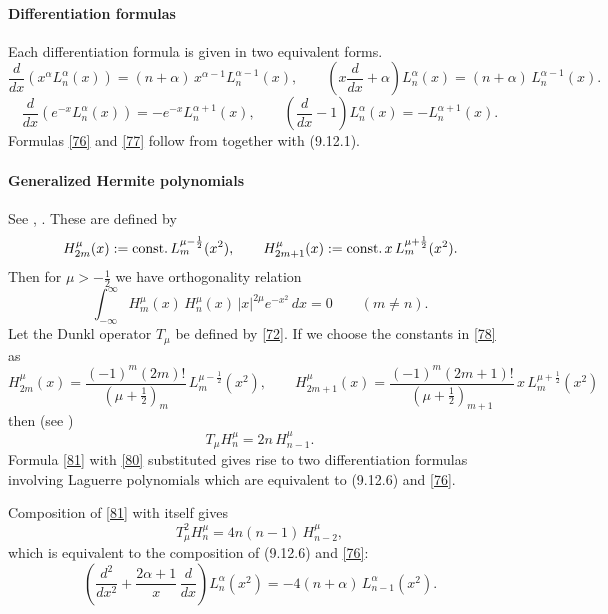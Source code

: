 \documentclass[envcountchap,graybox]{svmono}
\newcounter{rom}
\newcommand\al\alpha
\newcommand\half{\frac12}
\newcommand\thalf{\tfrac12}
\newcommand\iy\infty
\newcommand\const{{\rm const.}\,}
\begin{document}
\paragraph{Differentiation formulas}
Each differentiation formula is given in two equivalent forms.
\begin{equation}
\frac d{dx}\left(x^\al L_n^\al(x)\right)=
(n+\al)\,x^{\al-1} L_n^{\al-1}(x),\qquad
\left(x\frac d{dx}+\al\right)L_n^\al(x)=
(n+\al)\,L_n^{\al-1}(x).
\label{76}
\end{equation}
%
\begin{equation}
\frac d{dx}\left(e^{-x} L_n^\al(x)\right)=
-e^{-x} L_n^{\al+1}(x),\qquad
\left(\frac d{dx}-1\right)L_n^\al(x)=
-L_n^{\al+1}(x).
\label{77}
\end{equation}
%
Formulas \eqref{76} and \eqref{77} follow from
together with (9.12.1). 
%
\paragraph{Generalized Hermite polynomials}
See , \cite[Section 1.5.1]{K26}.
These are defined by
\begin{equation}
H_{2m}^\mu(x):=\const L_m^{\mu-\half}(x^2),\qquad
H_{2m+1}^\mu(x):=\const x\,L_m^{\mu+\half}(x^2).
\label{78}
\end{equation}
Then for $\mu>-\thalf$ we have orthogonality relation
\begin{equation}
\int_{-\iy}^{\iy} H_m^\mu(x)\,H_n^\mu(x)\,|x|^{2\mu}e^{-x^2}\,dx
=0\qquad(m\ne n).
\label{79}
\end{equation}
Let the Dunkl operator $T_\mu$ be defined by \eqref{72}.
If we choose the constants in \eqref{78} as
\begin{equation}
H_{2m}^\mu(x)=\frac{(-1)^m(2m)!}{(\mu+\thalf)_m}\,L_m^{\mu-\half}(x^2),\qquad
H_{2m+1}^\mu(x)=\frac{(-1)^m(2m+1)!}{(\mu+\thalf)_{m+1}}\,
 x\,L_m^{\mu+\half}(x^2)
 \label{80}
\end{equation}
then (see \cite[(1.6)]{K5})
\begin{equation}
T_\mu H_n^\mu=2n\,H_{n-1}^\mu.
\label{81}
\end{equation}
Formula \eqref{81} with \eqref{80} substituted gives rise to two
differentiation formulas involving Laguerre polynomials which are equivalent to
(9.12.6) and \eqref{76}.

Composition of \eqref{81} with itself gives
\[
T_\mu^2 H_n^\mu=4n(n-1)\,H_{n-2}^\mu,
\]
which is equivalent to the composition of (9.12.6) and \eqref{76}:
\begin{equation}
\left(\frac{d^2}{dx^2}+\frac{2\al+1}x\,\frac d{dx}\right)L_n^\al(x^2)
=-4(n+\al)\,L_{n-1}^\al(x^2).
\label{82}
\end{equation}
%
\end{document}
